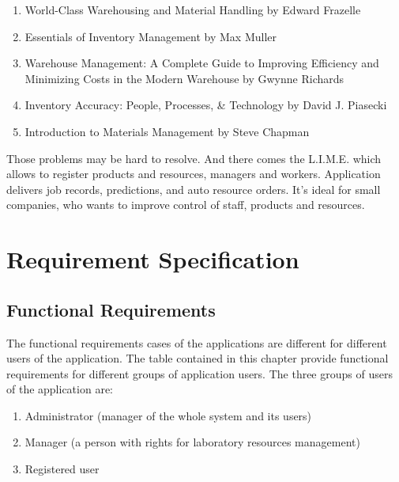 \documentclass[a4paper,11pt,twoside]{report}
\theoremstyle{definition}
\begin{document}
\begin{enumerate}

\item World-Class Warehousing and Material Handling by Edward Frazelle
\item Essentials of Inventory Management by Max Muller
\item Warehouse Management: A Complete Guide to Improving Efficiency and Minimizing Costs in the Modern Warehouse by Gwynne Richards
\item Inventory Accuracy: People, Processes, \& Technology by David J. Piasecki
\item Introduction to Materials Management by Steve Chapman 
\end{enumerate}

Those problems may be hard to resolve. And there comes the L.I.M.E. which allows to register products and resources, managers and workers. Application delivers job records, predictions, and auto resource orders. It’s ideal for small companies, who wants to improve control of staff, products and resources.



\chapter{Requirement Specification}



\section{Functional Requirements}


The functional requirements cases of the applications are different for different users of the application. The table contained in this chapter provide functional requirements for different groups of application users.
The three groups of users of the application are:
\begin{enumerate}

\item Administrator (manager of the whole system and its users)
\item Manager (a person with rights for laboratory resources management)
\item Registered user

\end{enumerate}
\end{document}
